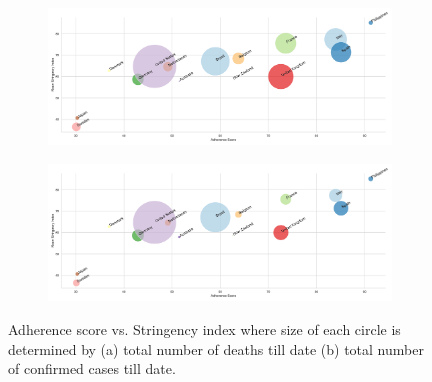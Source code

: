 \documentclass[fleqn,10pt]{wlscirep}
\begin{document}
    \begin{figure}
    	\centering
    	\begin{subfigure}[b]{\textwidth}
    		\centering
    		\includegraphics[width=0.7\linewidth]{FIG7}
    	\end{subfigure}
    	
    	\begin{subfigure}[b]{\textwidth}
    		\centering
    		\includegraphics[width=0.7\linewidth]{FIG8}
    	\end{subfigure}
    	
    	\caption[Mobility Trends]{Adherence score vs. Stringency index where size of each circle is determined by (a) total number of deaths till date (b) total number of confirmed cases till date.}
    	\label{fig3} 
    \end{figure}
\end{document}
